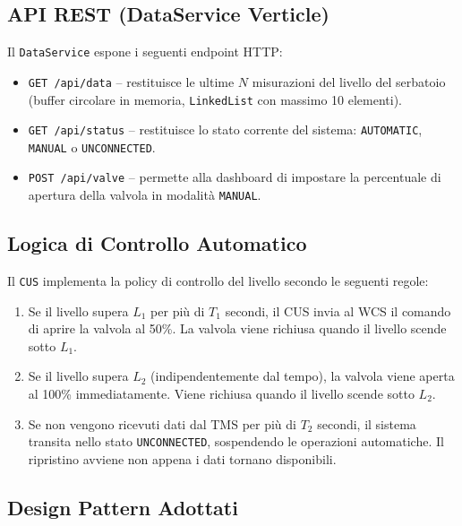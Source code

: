 \documentclass[12pt, a4paper]{article}
\begin{document}
\subsection{API REST (DataService Verticle)}

Il \texttt{DataService} espone i seguenti endpoint HTTP:

\begin{itemize}
    \item \texttt{GET /api/data} -- restituisce le ultime $N$ misurazioni del livello del serbatoio (buffer circolare in memoria, \texttt{LinkedList} con massimo 10 elementi).
    \item \texttt{GET /api/status} -- restituisce lo stato corrente del sistema: \texttt{AUTOMATIC}, \texttt{MANUAL} o \texttt{UNCONNECTED}.
    \item \texttt{POST /api/valve} -- permette alla dashboard di impostare la percentuale di apertura della valvola in modalità \texttt{MANUAL}.
\end{itemize}

\subsection{Logica di Controllo Automatico}

Il \texttt{CUS} implementa la policy di controllo del livello secondo le seguenti regole:

\begin{enumerate}
    \item Se il livello supera $L_1$ per più di $T_1$ secondi, il CUS invia al WCS il comando di aprire la valvola al 50\%. La valvola viene richiusa quando il livello scende sotto $L_1$.
    \item Se il livello supera $L_2$ (indipendentemente dal tempo), la valvola viene aperta al 100\% immediatamente. Viene richiusa quando il livello scende sotto $L_2$.
    \item Se non vengono ricevuti dati dal TMS per più di $T_2$ secondi, il sistema transita nello stato \texttt{UNCONNECTED}, sospendendo le operazioni automatiche. Il ripristino avviene non appena i dati tornano disponibili.
\end{enumerate}

\subsection{Design Pattern Adottati}
\end{document}
